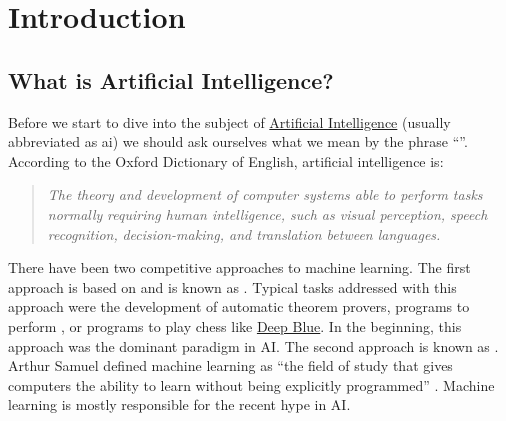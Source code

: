 \chapter{Introduction}

\section{What is Artificial Intelligence?}
Before we start to dive into the subject of
\href{https://en.wikipedia.org/wiki/Artificial_intelligence}{Artificial Intelligence} (usually abbreviated as
\ac{ai}) we should ask ourselves what we mean by the phrase ``''.
According to the Oxford Dictionary of English, 
artificial intelligence is:
\begin{quote}
  \colorbox{sepia}{\textsl{The theory and development of computer systems able to perform tasks normally}} \linebreak
  \colorbox{sepia}{\textsl{requiring human intelligence, such as visual perception, speech recognition,}}  \linebreak
  \colorbox{sepia}{\textsl{decision-making, and translation between languages.}} 
\end{quote}
There have been two competitive approaches to machine learning.  The first approach is based on
 and is known as .  
Typical tasks addressed with this approach were the development of automatic theorem provers, programs to
perform , or programs to play chess like
\href{https://en.wikipedia.org/wiki/Deep_Blue_(chess_computer)}{Deep Blue}.
In the beginning, this approach was the dominant paradigm in AI.
The second approach is known as .  Arthur Samuel defined machine learning as
``the field of study that gives computers the ability to learn without being
explicitly programmed'' \cite{samuel:1959}. 
Machine learning is mostly responsible for the recent hype in AI.

